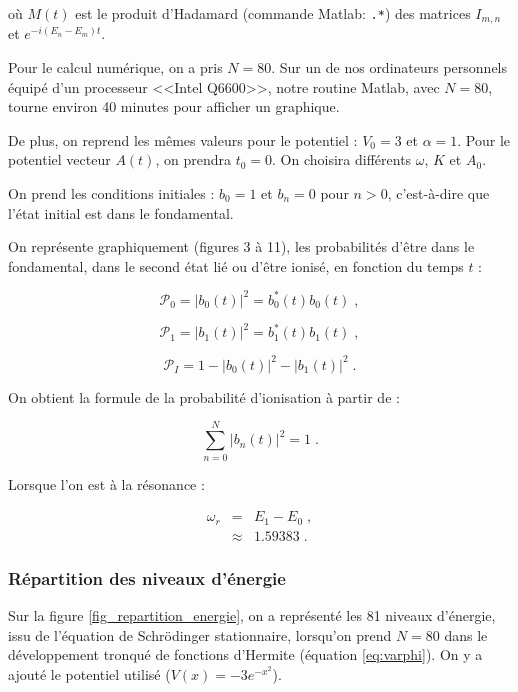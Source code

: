 \documentclass{report}
\begin{document}
où $M(t)$ est le produit d'Hadamard (commande Matlab: \texttt{.*}) des matrices $I_{m,n}$ et $e^{-i(E_{n}-E_{m})t}$. 

Pour le calcul numérique, on a pris $N=80$. Sur un de nos ordinateurs personnels équipé d'un processeur <<Intel Q6600>>, notre routine Matlab, avec $N=80$, tourne environ 40 minutes pour afficher un graphique. 

De plus, on reprend les mêmes valeurs pour le potentiel : $V_{0} = 3$ et $\alpha = 1$. Pour le potentiel vecteur $A(t)$, on prendra $t_{0}=0$. On choisira différents $\omega$, $K$ et $A_{0}$.

On prend les conditions initiales : $b_{0}=1$ et $b_{n}=0$ pour $n > 0$, c'est-à-dire que l'état initial est dans le fondamental.

On représente graphiquement (figures 3 à 11), les probabilités d'être dans le fondamental, dans le second état lié ou d'être ionisé, en fonction du temps $t$ : 

\begin{equation}
\mathcal{P}_{0}=\left| b_{0}(t)\right|^2= b^\ast_0(t)b_0(t)\;,
\end{equation}

\begin{equation}
\mathcal{P}_{1}=\left| b_{1}(t)\right|^2= b^\ast_1(t)b_1(t)\;,
\end{equation}

\begin{equation}
\mathcal{P}_{I}=1-\left| b_{0}(t)\right|^2-\left| b_{1}(t)\right|^2\;.
\end{equation}

On obtient la formule de la probabilité d'ionisation à partir de :

\begin{equation}
\sum_{n=0}^{N} \left| b_{n}(t)\right|^2 =1\;.
\end{equation}


Lorsque l'on est à la résonance :

\begin{eqnarray}
\omega_{r} &=& E_{1}-E_{0}\;,\\
&\approx& 1.59383\;.
\end{eqnarray}

\subsubsection{Répartition des niveaux d'énergie}

Sur la figure \ref{fig_repartition_energie}, on a représenté les 81 niveaux d'énergie, issu de l'équation de Schrödinger stationnaire, lorsqu'on prend $N=80$ dans le développement tronqué de fonctions d'Hermite (équation \eqref{eq:varphi}). On y a ajouté le potentiel utilisé ($V(x)= -3e^{- x^{2}}$).
\end{document}
